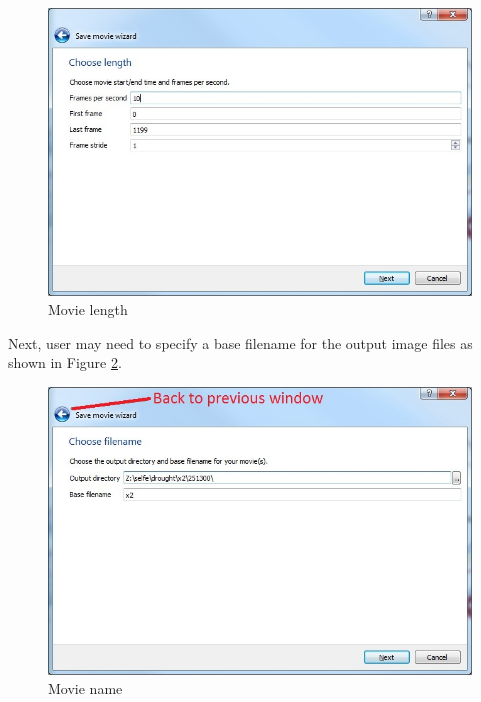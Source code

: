 \documentclass[12pt]{report}
\begin{document}
				\begin{figure}
        \begin{center}
        \includegraphics[scale=0.75]{movieLength}
        \caption{Movie length}
        \label{figure:movieLength}
        \end{center}
        \end{figure}
				
				Next, user may need to specify a base filename for the output image files as shown in Figure \ref {figure:movieName}.
				\begin{figure}
        \begin{center}
        \includegraphics[scale=0.75]{movieName}
        \caption{Movie name}
        \label{figure:movieName}
        \end{center}
        \end{figure}
				
\end{document}
